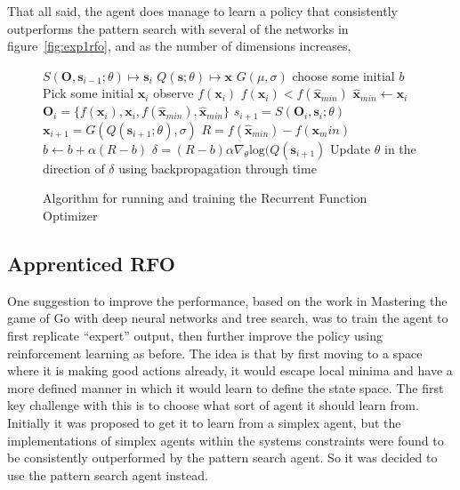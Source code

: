 That all said, the agent does manage to learn a policy that consistently outperforms the pattern search with several of the networks in figure~\ref{fig:exp1rfo}, and as the number of dimensions increases, %

\begin{figure}
\centering
\begin{minipage}{.8\textwidth}
\begin{algorithmic}
\State $S(\boldsymbol{O}, \boldsymbol{s}_{i-1}; \theta) \mapsto \boldsymbol{s}_i$
\State $Q(\boldsymbol{s} ;\theta) \mapsto \boldsymbol{x} $
\State $G(\mu,\sigma)$  
\State choose some initial $b$ 
 \Repeat
 	\State Pick some initial $\boldsymbol{x}_i$
 	\Repeat
 		\State observe $f(\boldsymbol{x}_i)$
 		\If $f(\boldsymbol{x}_i) < f(\hat{\boldsymbol{x}}_{min})$
 			\State$ \hat{\boldsymbol{x}}_{min} \gets \boldsymbol{x}_i$
 		\EndIf
 		\State $\boldsymbol{O}_i = \{f(\boldsymbol{x}_i),\boldsymbol{x}_i, f(\hat{\boldsymbol{x}}_{min}), \hat{\boldsymbol{x}}_{min}\} $
 		\State $s_{i+1} = S(\boldsymbol{O}_i, \boldsymbol{s}_{i}; \theta)$
 		\State $\boldsymbol{x}_{i+1} = G(Q(\boldsymbol{s}_{i+1};\theta),\sigma)$ 
	\State $R = f(\hat{\boldsymbol{x}}_{min}) - f(\boldsymbol{x}_min)$
	\State $b \gets b  + \alpha (R - b)$ 
	\State $\delta = (R - b) \alpha \nabla_\theta \text{log}(Q(\boldsymbol{s}_{i+1})$
	\State Update $\theta$ in the direction of $\delta$ using backpropagation through time
 \end{algorithmic}
 \end{minipage}
 \caption{Algorithm for running and training the Recurrent Function Optimizer}
 \label{alg:rfo}
\end{figure}

\subsection{Apprenticed RFO}



One suggestion to improve the performance, based on the work in Mastering the game of Go with deep neural networks and tree search\cite{alphaGo}, was to train the agent to first replicate ``expert'' output, then further improve the policy using reinforcement learning as before. The idea is that by first moving to a space where it is making good actions already, it would escape local minima and have a more defined manner in which it would learn to define the state space. The first key challenge with this is to choose what sort of agent it should learn from. Initially it was proposed to get it to learn from a simplex agent, but the implementations of simplex agents within the systems constraints were found to be consistently outperformed by the pattern search agent. So it was decided to use the pattern search agent instead.

